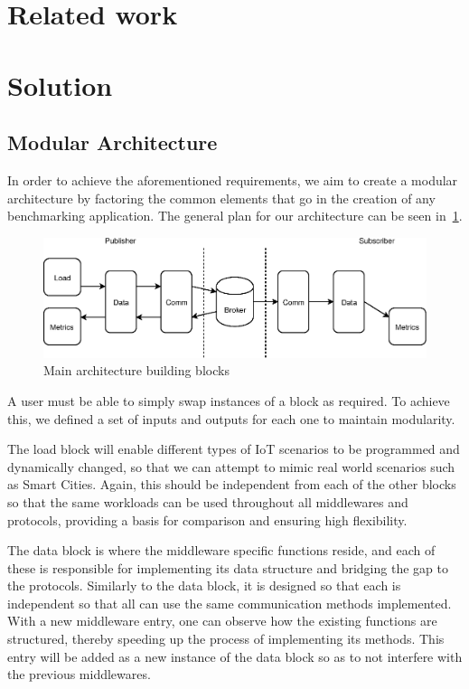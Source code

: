 \documentclass[conference]{IEEEtran}
\begin{document}
\section{Related work}


\section{Solution}

\subsection{Modular Architecture}

In order to achieve the aforementioned requirements, we aim to create a modular architecture by factoring the common elements that go in the creation of any benchmarking application. The general plan for our architecture can be seen in~\ref{fig:benchmark_architecture}.

\begin{figure}[htbp!]
  \centering
  \includegraphics[width=\linewidth]{figures/benchmark_architecture.eps}
  \caption{Main architecture building blocks}
  \label{fig:benchmark_architecture}
\end{figure}

A user must be able to simply swap instances of a block as required. To achieve this, we defined a set of inputs and outputs for each one to maintain modularity. 

The load block will enable different types of IoT scenarios to be programmed and dynamically changed, so that we can attempt to mimic real world scenarios such as Smart Cities. Again, this should be independent from each of the other blocks so that the same workloads can be used throughout all middlewares and protocols, providing a basis for comparison and ensuring high flexibility. 

The data block is where the middleware specific functions reside, and each of these is responsible for implementing its data structure and bridging the gap to the protocols. Similarly to the data block, it is designed so that each is independent so that all can use the same communication methods implemented. With a new middleware entry, one can observe how the existing functions are structured, thereby speeding up the process of implementing its methods. This entry will be added as a new instance of the data block so as to not interfere with the previous middlewares.
\end{document}
